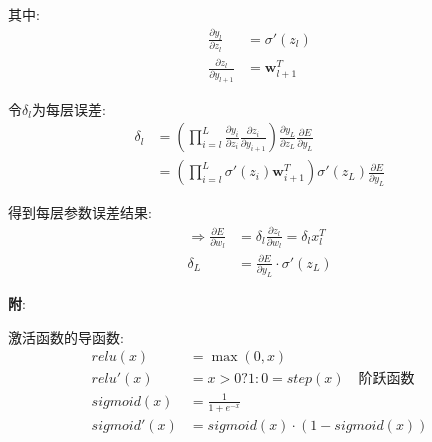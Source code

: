 \documentclass{article}
\begin{document}
        	    其中:
        		    \begin{align*}
        		        \frac{\partial y_l}{\partial z_l} &= \sigma'(z_l)\\
        		        \frac{\partial z_l}{\partial y_{l+1}} &= \boldsymbol w_{l+1}^T
        		    \end{align*}
        		    
        		令$\delta_l$为每层误差:
        		    \begin{align*}
        		        \delta_l &=\left(\prod_{i = l}^{L} \frac{\partial y_i}{\partial z_i}\frac{\partial z_i}{\partial y_{i+1}} \right) \frac{\partial y_L}{\partial z_L} \frac{\partial E}{\partial y_L}\\
        		        &= \left(\prod_{i = l}^{L} \sigma'(z_i)\boldsymbol w_{i+1}^T\right) \sigma '(z_L)\frac{\partial E}{\partial y_L}
        		    \end{align*}
        		    
        		得到每层参数误差结果:
        		    \begin{align*}
        		        \Rightarrow \frac{\partial E}{\partial w_l} &= \delta_l \frac{\partial z_l}{\partial w_l} = \delta_l x_l^T\\
        		        \delta_L &= \frac{\partial E}{\partial y_L} ·\sigma '(z_L)
        		    \end{align*}
        		    
            \textbf{附}:
            
        		激活函数的导函数:
        		    \begin{align*}
        		        relu(x) &= \max(0, x)\\
        		        relu'(x) &= x > 0 ? 1 : 0 = step(x) \quad \text{阶跃函数}\\
        		        sigmoid(x) &= \frac{1}{1+e^{-x}}\\
        		        sigmoid'(x) &= sigmoid(x) · (1 - sigmoid(x))
        		    \end{align*}

 
\end{document}
